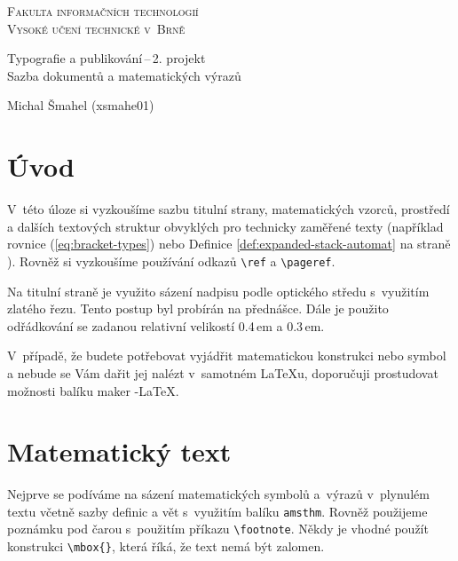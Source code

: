 \documentclass[a4paper, 11pt, twocolumn, final]{article}
\theoremstyle{definition}
\theoremstyle{plain}
\begin{document}
\begin{titlepage}
\begin{center}
    {\Huge \textsc{Fakulta informačních technologií}\\[0.4em]}
    {\Huge \textsc{Vysoké učení technické v~Brně}}\\
    
    
    {\LARGE Typografie a publikování\,--\,2. projekt\\[0.3em]}
    {\LARGE Sazba dokumentů a matematických výrazů}\\
    
\end{center}

{\Large {} \hfill Michal Šmahel (xsmahe01)}
\end{titlepage}

\section*{Úvod}

V~této úloze si vyzkoušíme sazbu titulní strany, matematic\-kých vzorců, prostředí
a dalších textových struktur obvyklých pro technicky zaměřené texty (například
rovnice (\ref{eq:bracket-types}) nebo Definice \ref{def:expanded-stack-automat}
na straně \pageref{def:expanded-stack-automat}). Rovněž si vyzkoušíme používání
odkazů \verb|\ref| a \verb|\pageref|.

Na titulní straně je využito sázení nadpisu podle optického středu s~využitím
zlatého řezu. Tento postup byl probírán na přednášce. Dále je použito odřádkování
se zadanou relativní velikostí 0.4\,em a 0.3\,em.

V~případě, že budete potřebovat vyjádřit matematickou
konstrukci nebo symbol a nebude se Vám dařit jej nalézt
v~samotném \LaTeX{}u, doporučuji prostudovat možnosti balíku maker \AmS-\LaTeX.

\section{Matematický text}

Nejprve se podíváme na sázení matematických symbolů a~výrazů v~plynulém textu
včetně sazby definic a vět s~využitím balíku \texttt{amsthm}. Rovněž použijeme
poznámku pod čarou s~použitím příkazu \verb|\footnote|. Někdy je vhodné použít
konstrukci \verb|\mbox{}|, která říká, že text nemá být zalomen.
\end{document}
